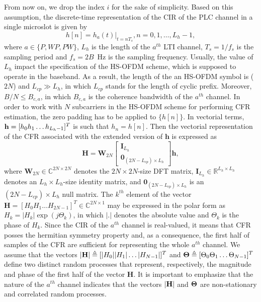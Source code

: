 \documentclass[journal]{IEEEtran}
\begin{document}
From now on, we drop the index $i$ for the sake of simplicity. Based on this assumption, the discrete-time representation of the \ac{CIR} of the \ac{PLC} channel in a single microslot is given by
\begin{equation} \label{discreteCFR}
h[n] = h_{a}(t)|_{t=nT_s} , n = 0,1, \ldots, L_h-1, 
\end{equation}
where $a\in \{P, WP, PW \}$, $L_{h}$ is the length of the $a^{th}$ \ac{LTI} channel, $T_s=1/f_s$ is the sampling period and $f_s=2B$~Hz is the sampling frequency. Usually, the value of $L_{h}$ impact the specification of the \ac{HS-OFDM} scheme, which is supposed to operate in the baseband. As a result, the length of the an \ac{HS-OFDM} symbol is ($2N$) and $L_{cp} \gg L_h$, in which $L_{cp}$ stands for the length of cyclic prefix. Moreover, $B/N \le B_{c,a}$, in which $B_{c,a}$ is the coherence bandwidth of the $a^{th}$ channel. In order to work with $N$ subcarriers in the \ac{HS-OFDM} scheme for performing \ac{CFR} estimation, the zero padding has to be applied to $\{h[n]\}$. In vectorial terms, ${\bf h}=[h_0 h_1 \ldots h_{L_h-1}]^T$ is such that $h_n=h[n]$. Then the vectorial representation of the \ac{CFR} associated with the extended version of $\mathbf{h}$ is expressed as
\begin{equation}
\mathbf{H} = \mathbf{W}_{2N}  \begin{bmatrix} \mathbf{I}_{L_h} \\ \mathbf{0}_{(2N-L_{cp})\times L_{h}} \end{bmatrix} \mathbf{h},
\end{equation}
where $\mathbf{W}_{2N} \in \mathbb{C}^{2N\times 2N}$ denotes the $2N \times 2N$-size \ac{DFT} matrix, $ \mathbf{I}_{L_h} \in \mathbb{R}^{L_h\times L_h}$ denotes an $L_h\times L_h$-size identity matrix, and $ \mathbf{0}_{(2N-L_{cp})\times L_{h}} $ is an $ (2N-L_{cp})\times L_{h}$ null matrix. The $k^{th}$ element of the vector $\mathbf{H}=[H_0 H_1 \ldots H_{2N-1}]^T \in \mathbb{C}^{2N\times 1}$ may be expressed in the polar form as $H_k=|H_k|\exp(j \Theta_k)$, in which $|.|$ denotes the absolute value and $\Theta_k$ is the phase of $H_k$. Since the \ac{CIR} of the $a^{th}$ channel is real-valued, it means that \ac{CFR} posses the hermitian symmetry property and, as a consequence, the first half of samples of the \ac{CFR} are sufficient for representing the whole $a^{th}$ channel. We assume that the vectors $|{\bf H}|\triangleq [|H_0||H_1|\ldots |H_{N-1}|]^T$ and ${\bf \Theta}\triangleq[\Theta_0\Theta_1\ldots \Theta_{N-1}]^T$ define two distinct random processes that represent, respectively, the magnitude and phase of the first half of the vector $\mathbf{H}$. It is important to emphasize that the nature of the $a^{th}$ channel indicates that the vectors $|{\bf H}|$ and ${\bf \Theta}$ are non-stationary and correlated random processes. 
 
\end{document}

